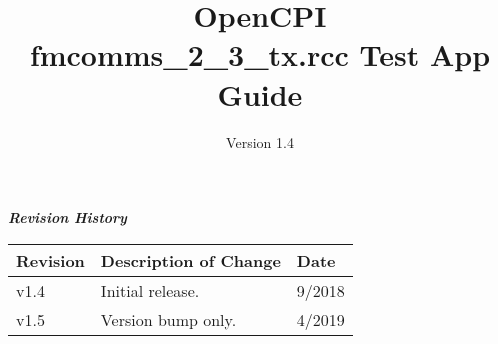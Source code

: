 \iffalse
This file is protected by Copyright. Please refer to the COPYRIGHT file
distributed with this source distribution.

This file is part of OpenCPI <http://www.opencpi.org>

OpenCPI is free software: you can redistribute it and/or modify it under the
terms of the GNU Lesser General Public License as published by the Free Software
Foundation, either version 3 of the License, or (at your option) any later
version.

OpenCPI is distributed in the hope that it will be useful, but WITHOUT ANY
WARRANTY; without even the implied warranty of MERCHANTABILITY or FITNESS FOR A
PARTICULAR PURPOSE. See the GNU Lesser General Public License for more details.

You should have received a copy of the GNU Lesser General Public License along
with this program. If not, see <http://www.gnu.org/licenses/>.
\fi

\def\docTitle{OpenCPI\\ fmcomms\_2\_3\_tx.rcc Test App Guide}
\def\docVersion{1.4}
\def\snippetpath{../../../../../doc/av/tex/snippets}


\date{Version \docVersion} %
\title{\docTitle}
\usepackage{graphicx}
\graphicspath{ {figures/} }
\usepackage{textcomp}
\usepackage{listings}


\maketitle

\begin{center}
  \textit{\textbf{Revision History}}
\end{center}
\begin{longtable}{|p{}
                  |p{}
                  |p{}|}
  \hline
  \rowcolor{blue}
  \textbf{Revision} & \textbf{Description of Change} & \textbf{Date} \\
  \hline
  v1.4 & Initial release. & 9/2018 \\
  \hline
  v1.5 & Version bump only. & 4/2019 \\
  \hline
\end{longtable}

